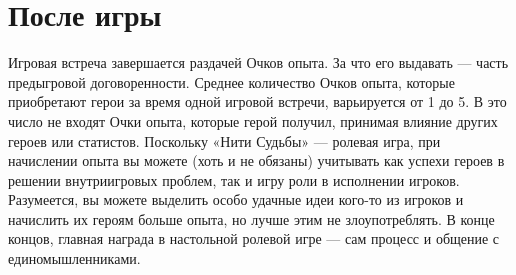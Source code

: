 \section{После игры}
Игровая встреча завершается раздачей Очков опыта. За что его выдавать — часть предыгровой договоренности. Среднее количество Очков опыта, которые приобретают герои за время одной игровой встречи, варьируется от 1 до 5. В это число не входят Очки опыта, которые герой получил, принимая влияние других героев или статистов.
\newline
Поскольку «Нити Судьбы» — ролевая игра, при начислении опыта вы можете (хоть и не обязаны) учитывать как успехи героев в решении внутриигровых проблем, так и игру роли в исполнении игроков.
\newline
Разумеется, вы можете выделить особо удачные идеи кого-то из игроков и начислить их героям больше опыта, но лучше этим не злоупотреблять. В конце концов, главная награда в настольной ролевой игре — сам процесс и общение с единомышленниками.